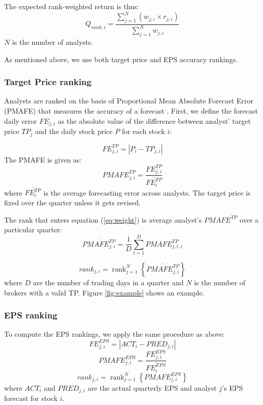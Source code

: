 \documentclass{article}\usepackage[]{graphicx}\usepackage[]{color}
\DeclareMathOperator{\rank}{rank}
\begin{document}
The expected rank-weighted return is thus:
\begin{equation}
\label{rankq}
Q_{rank,i}=\frac{\sum_{j=1}^{N} (w_{j,i} \times r_{j,i})}{\sum_{j=1}^{N} w_{j,i}}
\end{equation}
$N$ is the number of analysts.

As mentioned above, we use both target price and EPS accuracy rankings.

\subsubsection{Target Price ranking} 
Analysts are ranked on the basis of Proportional Mean Absolute Forecast Error (PMAFE) that measures the accuracy of a forecast  \citep{clement1999,brown2001,ertimur2007}. First,  we define the forecast daily error  $FE_{j,i}$ as the absolute value of the difference between analyst' target price $TP_{j}$ and the daily stock price $P$ for each stock $i$:

\begin{equation}
\label{dfe}
FE_{j,i}^{TP}=|{P_{i}-TP_{j,i}}|
\end{equation}
The PMAFE is given as:
\begin{equation}
\label{tp:pmafe}
PMAFE_{j,i}^{TP}=\frac{FE_{j,i}^{TP}}{\overline{FE_{i}^{TP}}}
\end{equation}
where $\overline{{FE}_{i}^{TP}}$ is the average forecasting error across analysts. The target price is fixed over the quarter unless it gets revised.

The rank  that enters equation (\ref{eq:weight}) is average analyst's $PMAFE^{TP}$ over a particular quarter:
\begin{equation}
\overline{PMAFE_{j,i}^{TP}}=\frac{1}{D} \sum_{t=1}^{D} PMAFE_{j,t,i}^{TP}
\end{equation}

\begin{equation}
\label{tp:rank}
rank_{j,i}=\rank_{j=1}^{N} \left\{ \overline{PMAFE_{j,i}^{TP}} \right\}
\end{equation}
where $D$ are the number of trading days in a quarter and $N$ is the number of brokers with a valid TP.  Figure \ref{fig:example} shows an example.


\subsubsection{EPS ranking} 
To compute the EPS rankings, we apply the same procedure as above:
\begin{equation}
FE_{j,i}^{EPS}=|{ACT_{i}-PRED_{j,i}}|
\end{equation}
\begin{equation}
PMAFE_{j,i}^{EPS}= \frac{FE_{j,i}^{EPS}}{\overline{FE_{i}^{EPS}}}
\end{equation}
\begin{equation}
\label{eps:rank}
rank_{j,i}=\rank_{j=1}^{N} \left\{ PMAFE_{j,i}^{EPS} \right\} 
\end{equation}
where $ACT_{i}$ and $PRED_{j,i}$ are the actual quarterly EPS and  analyst $j$'s EPS forecast for stock $i$.
\end{document}
